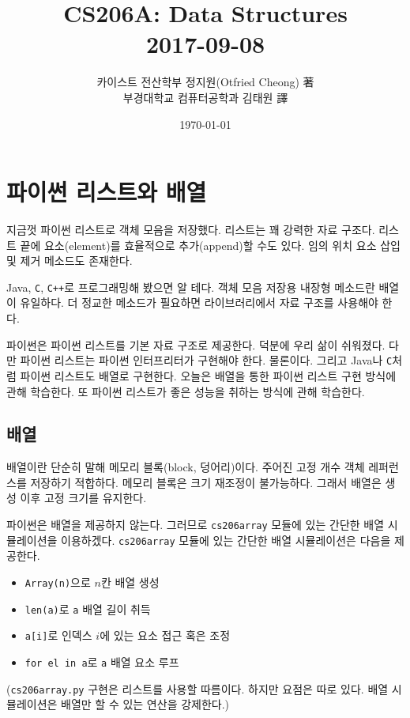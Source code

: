 \documentclass[a4paper]{oblivoir}
\title{CS206A: Data Structures\\2017-09-08}
\author{카이스트 전산학부 정지원(Otfried Cheong) 著\\부경대학교 컴퓨터공학과 김태원 譯}
\date{\today}
\begin{document}
\maketitle

\section*{파이썬 리스트와 배열}

지금껏 파이썬 리스트로 객체 모음을 저장했다. 리스트는 꽤 강력한 자료 구조다. 리스트 끝에 요소(element)를 효율적으로  추가(append)할 수도 있다. 임의 위치 요소 삽입 및 제거 메소드도 존재한다.

Java, \texttt{C}, \texttt{C++}로 프로그래밍해 봤으면 알 테다. 객체 모음 저장용 내장형 메소드란 배열이 유일하다. 더 정교한 메소드가 필요하면 라이브러리에서 자료 구조를 사용해야 한다.

파이썬은 파이썬 리스트를 기본 자료 구조로 제공한다. 덕분에 우리 삶이 쉬워졌다. 다만 파이썬 리스트는 파이썬 인터프리터가 구현해야 한다. 물론이다. 그리고 Java나 \texttt{C}처럼 파이썬 리스트도 배열로 구현한다. 오늘은 배열을 통한 파이썬 리스트 구현 방식에 관해 학습한다. 또 파이썬 리스트가 좋은 성능을 취하는 방식에 관해 학습한다.

\subsection*{배열}

배열이란 단순히 말해 메모리 블록(block, 덩어리)이다. 주어진 고정 개수 객체 레퍼런스를 저장하기 적합하다. 메모리 블록은 크기 재조정이 불가능하다. 그래서 배열은 생성 이후 고정 크기를 유지한다.

파이썬은 배열을 제공하지 않는다. 그러므로 \texttt{cs206array} 모듈에 있는 간단한 배열 시뮬레이션을 이용하겠다. \texttt{cs206array} 모듈에 있는 간단한 배열 시뮬레이션은 다음을 제공한다.

\begin{itemize}
    \setlength\itemsep{-0.5em}
    \item \texttt{Array(n)}으로 $n$칸 배열 생성
    \item \texttt{len(a)}로 \texttt{a} 배열 길이 취득
    \item \texttt{a[i]}로 인덱스 $i$에 있는 요소 접근 혹은 조정
    \item \texttt{for el in a}로 \texttt{a} 배열 요소 루프
\end{itemize}

\noindent (\texttt{cs206array.py} 구현은 리스트를 사용할 따름이다. 하지만 요점은 따로 있다. 배열 시뮬레이션은 배열만 할 수 있는 연산을 강제한다.)
\end{document}
